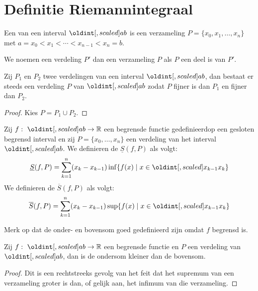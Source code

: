 \documentclass[main.tex]{subfiles}
\begin{document}
\section{Definitie Riemannintegraal}
\label{sec:defin-riem}

\begin{de}
  Een  van een interval $\interval{a}{b}$ is een verzameling $P = \{x_{0},x_{1},\dotsc,x_{n}\}$ met $a = x_{0} < x_{1} < \dotsb < x_{n-1} < x_{n} = b$.
\end{de}

\begin{de}
  We noemen een verdeling $P'$  dan een verzameling $P$ als $P$ een deel is van $P'$.
\end{de}

\begin{st}
  Zij $P_{1}$ en $P_{2}$ twee verdelingen van een interval $\interval{a}{b}$, dan bestaat er steeds een verdeling $P$ van $\interval{a}{b}$ zodat $P$ fijner is dan $P_{1}$ en fijner dan $P_{2}$.

  \begin{proof}
    Kies $P = P_{1} \cup P_{2}$.
  \end{proof}
\end{st}

\begin{de}
  Zij $f:\ \interval{a}{b} \rightarrow \mathbb{R}$ een begrensde functie gedefinieerdop een gesloten begrensd interval en zij $P = \{x_{0},\dotsc,x_{n}\}$ een verdeling van het interval $\interval{a}{b}$.
  We definieren de  $\underline{S}(f,P)$ als volgt:
  \[ \underline{S}(f,P) = \sum_{k=1}^{n} (x_{k}-x_{k-1}) \inf\{ f(x) \mid x\in \interval{x_{k-1}}{x_{k}}\} \]
  We definieren de  $\overline{S}(f,P)$ als volgt:  
  \[ \overline{S}(f,P) = \sum_{k=1}^{n} (x_{k}-x_{k-1}) \sup\{ f(x) \mid x\in \interval{x_{k-1}}{x_{k}}\} \]
\end{de}

\begin{opm}
  Merk op dat de onder- en bovensom goed gedefinieerd zijn omdat $f$ begrensd is.
\end{opm}

\begin{bpr}
  Zij $f:\ \interval{a}{b} \rightarrow \mathbb{R}$ een begrensde functie en $P$ een verdeling van $\interval{a}{b}$, dan is de ondersom kleiner dan de bovensom.

  \begin{proof}
    Dit is een rechtstreeks gevolg van het feit dat het supremum van een verzameling groter is dan, of gelijk aan, het infimum van die verzameling.
  \end{proof}
\end{bpr}
\end{document}
